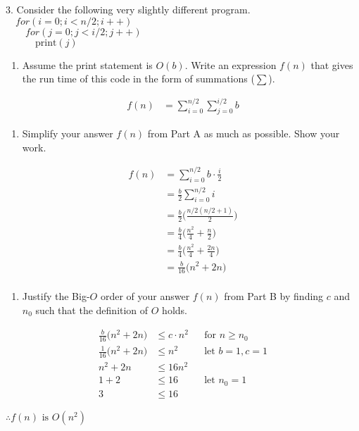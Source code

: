 \documentclass[12pt]{article}
\begin{document}
\begin{flushleft}
3. Consider the following very slightly different program.\\[.2in]
$\quad for(i=0;i<n/2;i++)$\\
$\qquad for(j=0;j<i/2;j++)$\\
$\quad \qquad \text{print}(j)$\\[.2in]
\end{flushleft}
\begin{enumerate}[label=A.]
\item Assume the print statement is $O(b)$. Write an expression $f(n)$ that gives the run time of this code in the form of summations ($\sum$).
\end{enumerate}
\begin{align*}
f(n)&=\sum_{i=0}^{n/2}\sum_{j=0}^{i/2}b
\end{align*}
\begin{enumerate}[label=B.]
\item Simplify your answer $f(n)$ from Part A as much as possible. Show your work.
\end{enumerate}
\begin{align*}
f(n)&=\sum_{i=0}^{n/2}b\cdot\frac{i}{2}\\
&=\frac{b}{2}\sum_{i=0}^{n/2}i\\
&=\frac{b}{2}\Bigg(\frac{n/2(n/2+1)}{2}\Bigg)\\
&=\frac{b}{4}\Bigg(\frac{n^2}{4}+\frac{n}{2}\Bigg)\\
&=\frac{b}{4}\Bigg(\frac{n^2}{4}+\frac{2n}{4}\Bigg)\\
&=\frac{b}{16}\big(n^2+2n\big)\\
\end{align*}
\begin{enumerate}[label=C.]
\item Justify the Big-$O$ order of your answer $f(n)$ from Part B by finding $c$ and $n_{0}$ such that the definition of $O$ holds.
\end{enumerate}
\begin{align*}
\frac{b}{16}\big(n^2+2n\big)&\leq c\cdot n^2 &&\text{for } n\geq n_{0}\\
\frac{1}{16}\big(n^2+2n\big)&\leq n^2 &&\text{let } b=1,c=1\\
n^2+2n&\leq 16n^2\\
1+2&\leq 16 &&\text{let } n_{0}=1\\
3&\leq 16
\end{align*}
\begin{center}
$\therefore f(n) \text{ is } O(n^2)$
\end{center}
\newpage
\end{document}
